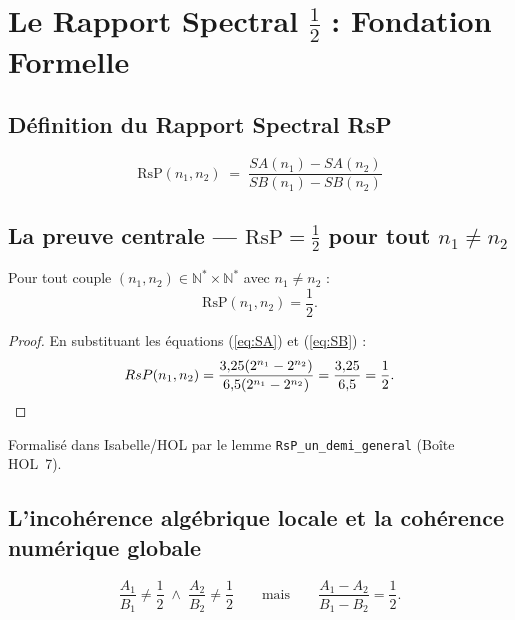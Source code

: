 \documentclass[]{pasj02}
\begin{document}
\section{Le Rapport Spectral $\tfrac{1}{2}$ : Fondation Formelle}
\label{sec:rsp}

\subsection{Définition du Rapport Spectral RsP}
\label{ssec:rsp_def}
\label{hol:rsp_definition}

\begin{equation}
  \mathrm{RsP}(n_1,n_2) \;=\;
  \frac{SA(n_1)-SA(n_2)}{SB(n_1)-SB(n_2)}
\end{equation}

\subsection{La preuve centrale --- $\mathrm{RsP} = \tfrac{1}{2}$ pour tout
$n_1 \neq n_2$}
\label{ssec:preuve_centrale}
\label{hol:rsp_un_demi_general}

\begin{theorem}
  Pour tout couple $(n_1, n_2) \in \mathbb{N}^*\times\mathbb{N}^*$ avec
  $n_1 \neq n_2$ :
  \begin{equation}
    \mathrm{RsP}(n_1,n_2) = \frac{1}{2}.
  \end{equation}
\end{theorem}

\begin{proof}
  En substituant les équations (\ref{eq:SA}) et (\ref{eq:SB}) :
  \[
    \mathrm{RsP}(n_1,n_2)
    = \frac{3{,}25(2^{n_1}-2^{n_2})}{6{,}5(2^{n_1}-2^{n_2})}
    = \frac{3{,}25}{6{,}5} = \frac{1}{2}. \qedhere
  \]
\end{proof}

\noindent Formalisé dans Isabelle/HOL par le lemme
\texttt{RsP\_un\_demi\_general} (Boîte HOL~7).

\subsection{L'incohérence algébrique locale et la cohérence numérique
globale}
\label{ssec:incoherence}
\label{hol:incoherence_locale}

\begin{equation}
  \frac{A_1}{B_1} \neq \frac{1}{2}
  \;\wedge\;
  \frac{A_2}{B_2} \neq \frac{1}{2}
  \qquad\text{mais}\qquad
  \frac{A_1 - A_2}{B_1 - B_2} = \frac{1}{2}.
\end{equation}
\end{document}
